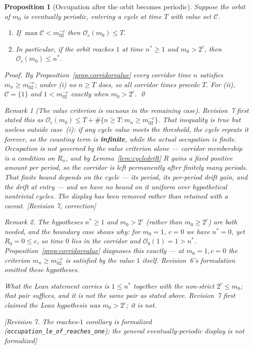 \documentclass[11pt]{article}
\theoremstyle{plain}
\newtheorem{proposition}[theorem]{Proposition}
\theoremstyle{definition}
\theoremstyle{remark}
\newtheorem*{remark*}{Remark}
\newcommand{\Occ}{\mathcal{O}}
\newcommand{\status}[1]{\textsf{\footnotesize[#1]}}
\begin{document}
\begin{proposition}[Occupation after the orbit becomes periodic]\label{prop:occstop}
Suppose the orbit of $m_0$ is eventually periodic, entering a cycle at time $T$ with value set
$\mathcal{C}$.
\begin{enumerate}[label=(\roman*),leftmargin=2em]
\item If $\max\mathcal{C}<m_02^{-c}$ then $\Occ_c(m_0)\le T$.
\item In particular, if the orbit reaches $1$ at time $n^*\ge1$ and $m_0>2^{c}$, then
  $\Occ_c(m_0)\le n^*$.
\end{enumerate}

\emph{Proof.} By Proposition~\ref{prop:corridorvalue} every corridor time $n$ satisfies
$m_n\ge m_02^{-c}$; under (i) no $n\ge T$ does, so all corridor times precede $T$. For (ii),
$\mathcal{C}=\{1\}$ and $1<m_02^{-c}$ exactly when $m_0>2^{c}$. \qed

\begin{remark*}[The value criterion is vacuous in the remaining case]
Revision~7 first stated this as $\Occ_c(m_0)\le T+\#\{n\ge T: m_n\ge m_02^{-c}\}$. That inequality
is true but \emph{useless} outside case~(i): if any cycle value meets the threshold, the cycle
repeats it forever, so the counting term is \textbf{infinite}, while the actual occupation is
finite. Occupation is not governed by the value criterion alone --- corridor membership is a
condition on $R_n$, and by Lemma~\ref{lem:cycledrift} $R$ gains a fixed positive amount per period,
so the corridor is left permanently after finitely many periods. That finite bound depends on the
cycle --- its period, its per-period drift gain, and the drift at entry --- and we have no bound on
it uniform over hypothetical nontrivial cycles. The display has been removed rather than retained
with a caveat. \status{Revision 7, correction}
\end{remark*}

\begin{remark*}
The hypotheses $n^*\ge1$ and $m_0>2^{c}$ (rather than $m_0\ge2^{c}$) are both needed, and the
boundary case shows why: for $m_0=1$, $c=0$ we have $n^*=0$, yet $R_0=0\le c$, so time $0$ lies in
the corridor and $\Occ_0(1)=1>n^*$. Proposition~\ref{prop:corridorvalue} diagnoses this exactly ---
at $m_0=1,c=0$ the criterion $m_n\ge m_02^{-c}$ is satisfied by the value $1$ itself. Revision~6's
formulation omitted these hypotheses.

What the Lean statement carries is $1\le n^*$ together with the \emph{non-strict} $2^{c}\le m_0$;
that pair suffices, and it is not the same pair as stated above. Revision~7 first claimed the Lean
hypothesis was $m_0>2^{c}$; it is not.
\end{remark*}
\status{Revision 7. The reaches-$1$ corollary is formalized
(\texttt{occupation\_le\_of\_reaches\_one}); the general eventually-periodic
display is \emph{not} formalized}
\end{proposition}
\end{document}
